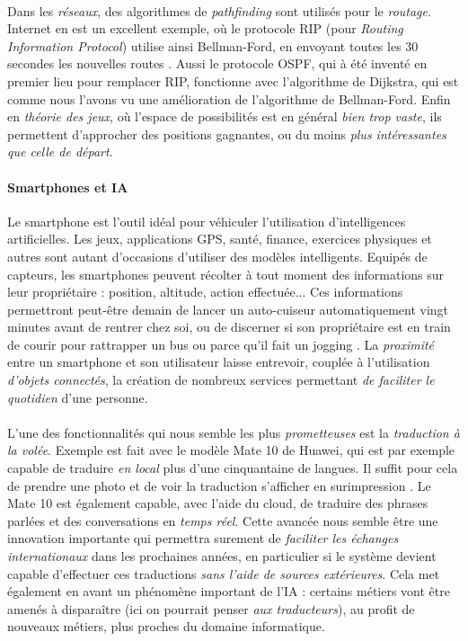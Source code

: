 \paragraph{} Dans les \emph{réseaux}, des algorithmes de \emph{pathfinding} sont utilisés pour le \emph{routage}. Internet
en est un excellent exemple, où le protocole RIP (pour \emph{Routing Information Protocol}) utilise ainsi Bellman-Ford, en
envoyant toutes les 30 secondes les nouvelles routes \cite{AI1}. Aussi le protocole OSPF, qui à été inventé en premier lieu
pour remplacer RIP, fonctionne avec l'algorithme de Dijkstra, qui est comme nous l'avons vu une amélioration de l'algorithme
de Bellman-Ford. Enfin en \emph{théorie des jeux}, où l'espace de possibilités est en général \emph{bien trop vaste}, ils
permettent d'approcher des positions gagnantes, ou du moins \emph{plus intéressantes que celle de départ}.

\paragraph{Smartphones et IA} Le smartphone est l'outil idéal pour véhiculer l'utilisation d'intelligences artificielles. Les jeux,
applications GPS, santé, finance, exercices physiques et autres sont autant d'occasions d'utiliser des modèles intelligents. Equipés de capteurs,
les smartphones peuvent récolter à tout moment des informations sur leur propriétaire : position, altitude, action effectuée... Ces informations
permettront peut-être demain de lancer un auto-cuiseur automatiquement vingt minutes avant de rentrer chez soi, ou de discerner si son 
propriétaire est en train de courir pour rattrapper un bus ou parce qu'il fait un jogging \cite{Smartphone0}. La \emph{proximité} entre 
un smartphone et son utilisateur laisse entrevoir, couplée à l'utilisation \emph{d'objets connectés}, la création de nombreux services
permettant \emph{de faciliter le quotidien} d'une personne. 

\paragraph{} L'une des fonctionnalités qui nous semble les plus \emph{prometteuses} est la \emph{traduction à la volée}. Exemple est fait
avec le modèle Mate 10 de Huawei, qui est par exemple capable de traduire \emph{en local} plus d'une cinquantaine de langues. Il suffit pour
cela de prendre une photo et de voir la traduction s'afficher en surimpression \cite{Smartphone0}. Le Mate 10 est également capable,
avec l'aide du cloud, de traduire des phrases parlées et des conversations en \emph{temps réel}. Cette avancée nous semble être une innovation
importante qui permettra surement de \emph{faciliter les échanges internationaux} dans les prochaines années, en particulier si le système devient
capable d'effectuer ces traductions \emph{sans l'aide de sources extérieures}. Cela met également en avant un phénomène important de l'IA : 
certains métiers vont être amenés à disparaître (ici on pourrait penser \emph{aux traducteurs}), au profit de nouveaux métiers, plus proches du
domaine informatique.

